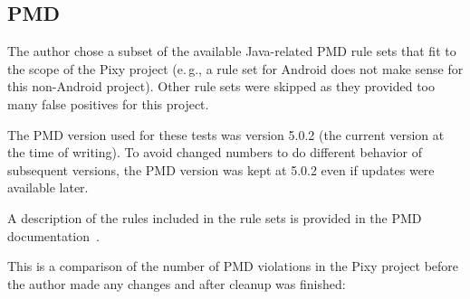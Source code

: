 \subsection{PMD}

The author chose a subset of the available Java-related PMD rule sets that fit to the scope of the Pixy project (e.\,g., a rule set for Android does not make sense for this non-Android project). Other rule sets were skipped as they provided too many false positives for this project.

The PMD version used for these tests was version 5.0.2 (the current version at the time of writing). To avoid changed numbers to do different behavior of subsequent versions, the PMD version was kept at 5.0.2 even if updates were available later.

A description of the rules included in the rule sets is provided in the PMD documentation~\cite{pmd-rulesets}.

This is a comparison of the number of PMD violations in the Pixy project before the author made any changes and after cleanup was finished:


